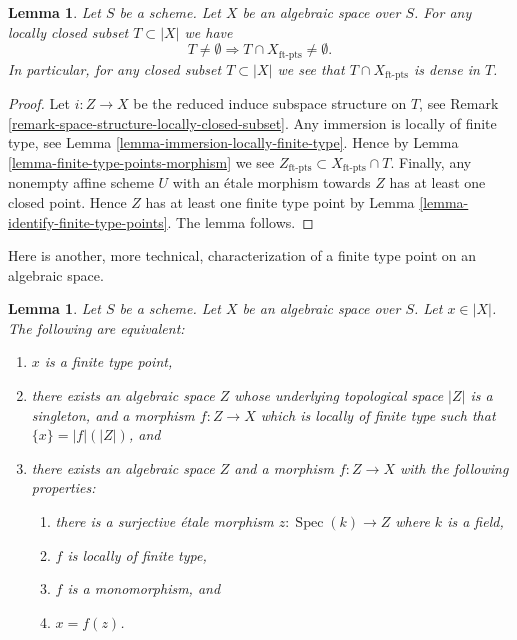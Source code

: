 \documentclass{stacks-project}
\theoremstyle{plain}
\newtheorem{lemma}[subsection]{Lemma}
\theoremstyle{definition}
\theoremstyle{remark}
\numberwithin{equation}{subsection}
\def\Spec{\mathop{\mathrm{Spec}}}
\begin{document}
\begin{lemma}
\label{lemma-enough-finite-type-points}
Let $S$ be a scheme. Let $X$ be an algebraic space over $S$.
For any locally closed subset $T \subset |X|$ we have
$$
T \not = \emptyset
\Rightarrow
T \cap X_{\text{ft-pts}} \not = \emptyset.
$$
In particular, for any closed subset $T \subset |X|$ we
see that $T \cap X_{\text{ft-pts}}$ is dense in $T$.
\end{lemma}

\begin{proof}
Let $i : Z \to X$ be the reduced induce subspace structure on $T$, see
Remark \ref{remark-space-structure-locally-closed-subset}.
Any immersion is locally of finite type, see
Lemma \ref{lemma-immersion-locally-finite-type}.
Hence by
Lemma \ref{lemma-finite-type-points-morphism}
we see $Z_{\text{ft-pts}} \subset X_{\text{ft-pts}} \cap T$.
Finally, any nonempty affine scheme $U$ with an \'etale morphism towards
$Z$ has at least one closed point. Hence $Z$ has at least one
finite type point by
Lemma \ref{lemma-identify-finite-type-points}.
The lemma follows.
\end{proof}

\noindent
Here is another, more technical, characterization of a finite type
point on an algebraic space.

\begin{lemma}
\label{lemma-point-finite-type-monomorphism}
Let $S$ be a scheme. Let $X$ be an algebraic space over $S$.
Let $x \in |X|$. The following are equivalent:
\begin{enumerate}
\item $x$ is a finite type point,
\item there exists an algebraic space $Z$ whose underlying topological space
$|Z|$ is a singleton, and a morphism $f : Z \to X$ which is locally of finite
type such that $\{x\} = |f|(|Z|)$, and
\item there exists an algebraic space $Z$ and a morphism $f : Z \to X$
with the following properties:
\begin{enumerate}
\item there is a surjective \'etale morphism
$z : \Spec(k) \to Z$ where $k$ is a field,
\item $f$ is locally of finite type,
\item $f$ is a monomorphism, and
\item $x = f(z)$.
\end{enumerate}
\end{enumerate}
\end{lemma}
\end{document}
